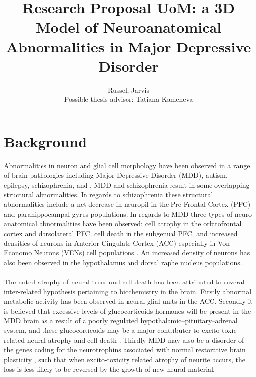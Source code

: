 \documentclass[a4paper,11pt]{article}
\title{Research Proposal UoM: a 3D Model of Neuroanatomical Abnormalities in Major Depressive Disorder}
\author{Russell Jarvis \\ Possible thesis advisor:  Tatiana Kameneva}
\begin{document}
\maketitle
\tableofcontents


\section{Background}
Abnormalities in neuron and glial cell morphology have been observed in a range of brain pathologies including Major Depressive Disorder (MDD), autism, epilepsy, schizophrenia, and \cite{rajkowska2000postmortem}  \cite{brune2011neuroanatomical} \cite{snow2008altered} \cite{courchesne1997brainstem} \cite{sutula2002seizure} \cite{selemon1999reduced}. MDD and schizophrenia result in some overlapping structural abnormalities. In regards to schizophrenia these structural abnormalities include a net decrease in neuropil in the Pre Frontal Cortex (PFC) and parahippocampal gyrus \cite{selemon1999reduced} populations. In regards to MDD three types of neuro anatomical abnormalities have been observed: cell atrophy in the orbitofrontal cortex and dorsolateral PFC, cell death in the subgenual PFC, and increased densities of neurons in Anterior Cingulate Cortex (ACC) especially in Von Economo Neurons (VENs) cell populations \cite{brune2011neuroanatomical}. An increased density of neurons has also been observed in the hypothalamus and dorsal raphe nucleus \cite{rajkowska2000postmortem} populations.\\
\\
The noted atrophy of neural trees and cell death has been attributed to several inter-related hypothesis pertaining to biochemistry in the brain. Firstly abnormal metabolic activity has been observed in neural-glial units in the ACC\cite{rajkowska2000postmortem}\cite{rajkowska1999morphometric}. Secondly it is believed that excessive levels of glucocorticoids hormones will be present in the MDD brain \cite{rajkowska2000postmortem} as a result of a poorly regulated hypothalamic–pituitary–adrenal system, and these glucocorticoids may be a major contributer to excito-toxic related neural atrophy and cell death \cite{sorrells2014glucocorticoids}. Thirdly MDD may also be a disorder of the genes coding for the neurotrophins associated with normal restorative brain plasticity \cite{dwivedi2010brain}, such that when excito-toxicity related atrophy of neurite occurs, the loss is less likely to be reversed by the growth of new neural material.\\
\end{document}
